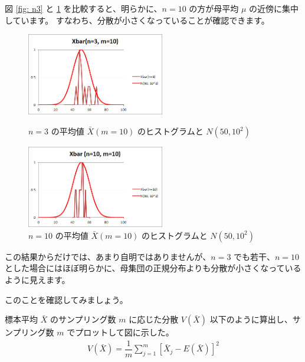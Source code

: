 \documentclass[uplatex,11pt,a4paper]{jsarticle}
\begin{document}
図 \ref{fig: n3} と \ref{fig: n10} を比較すると、明らかに、$n=10$ の方が母平均 $\mu$ の近傍に集中しています。
すなわち、分散が小さくなっていることが確認できます。
\begin{figure}[htb]
\begin{minipage}{0.5\hsize}
 \centering
	\includegraphics[width=6cm]{./figs/Xbar_n3M10.png}
	\caption{$n=3$ の平均値 $\bar{X} (m=10) $ のヒストグラムと $N(50, 10^2)$ }
	\label{fig: n3}
\end{minipage}
\begin{minipage}{0.5\hsize}
 \centering
	\includegraphics[width=6cm]{./figs/Xbar_n10M10.png}
	\caption{$n=10$ の平均値 $\bar{X} (m=10) $ のヒストグラムと $N(50, 10^2)$ }
	\label{fig: n10}
\end{minipage}
\end{figure}

この結果からだけでは、あまり自明ではありませんが、$n=3$ でも若干、$n=10$ とした場合にはほぼ明らかに、母集団の正規分布よりも分散が小さくなっているように見えます。

このことを確認してみましょう。

標本平均 $\bar{X}$ のサンプリング数 $m$ に応じた分散 $V(\bar{X})$ 以下のように算出し、サンプリング数 $m$ でプロットして図に示した。
\begin{align*}
V(\bar{X}) = \dfrac{1}{m} \sum_{j=1}^m [\bar{X}_j - E(\bar{X})]^2
\end{align*}
\end{document}
